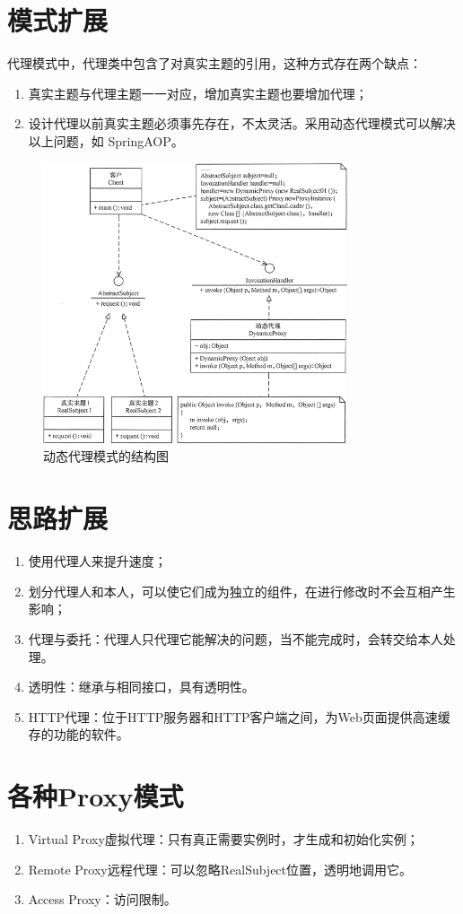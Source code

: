 \section{模式扩展}
代理模式中，代理类中包含了对真实主题的引用，这种方式存在两个缺点：
\begin{enumerate}
	\item 真实主题与代理主题一一对应，增加真实主题也要增加代理；
	\item 设计代理以前真实主题必须事先存在，不太灵活。采用动态代理模式可以解决以上问题，如 SpringAOP。
\end{enumerate}
\begin{figure}[!h]
	\centering
	\includegraphics[width=0.8\textwidth]{image/21-4}
	\caption{动态代理模式的结构图}
\end{figure}
\section{思路扩展}
\begin{enumerate}
	\item 使用代理人来提升速度；
	\item 划分代理人和本人，可以使它们成为独立的组件，在进行修改时不会互相产生影响；
	\item 代理与委托：代理人只代理它能解决的问题，当不能完成时，会转交给本人处理。
	\item 透明性：继承与相同接口，具有透明性。
	\item HTTP代理：位于HTTP服务器和HTTP客户端之间，为Web页面提供高速缓存的功能的软件。
\end{enumerate}
\section{各种Proxy模式}
\begin{enumerate}
	\item Virtual Proxy虚拟代理：只有真正需要实例时，才生成和初始化实例；
	\item Remote Proxy远程代理：可以忽略RealSubject位置，透明地调用它。
	\item Access Proxy：访问限制。
\end{enumerate}
